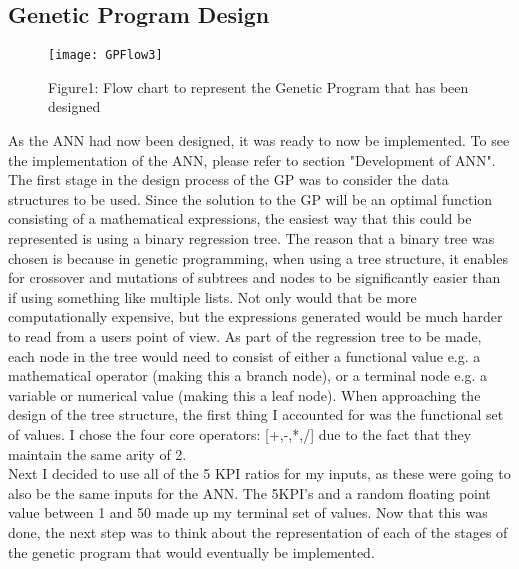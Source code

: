 \documentclass[11pt]{article}
\begin{document}
\subsection{Genetic Program Design}
\begin{figure}[h]
\centering
\texttt{[image: GPFlow3]}
\caption{Figure1: Flow chart to represent the Genetic Program that has been designed} 
\end{figure}
As the ANN had now been designed, it was ready to now be implemented. To see the implementation of the ANN, please refer to section "Development of ANN". The first stage in the design process of the GP was to consider the data structures to be used. Since the solution to the GP will be an optimal function consisting of a mathematical expressions, the easiest way that this could be represented is using a binary regression tree. The reason that a binary tree was chosen is because in genetic programming, when using a tree structure, it enables for crossover and mutations of subtrees and nodes to be significantly easier than if using something like multiple lists. Not only would that be more computationally expensive, but the expressions generated would be much harder to read from a users point of view. As part of the regression tree to be made, each node in the tree would need to consist of either a functional value e.g. a mathematical operator (making this a branch node), or a terminal node e.g. a variable or numerical value (making this a leaf node). When approaching the design of the tree structure, the first thing I accounted for was the functional set of values. I chose the four core operators: [+,-,*,/] due to the fact that they maintain the same arity of 2.\\
 Next I decided to use all of the 5 KPI ratios for my inputs, as these were going to also be the same inputs for the ANN. The 5KPI's and a random floating point value between 1 and 50 made up my terminal set of values. Now that this was done, the next step was to think about the representation of each of the stages of the genetic program that would eventually be implemented. 
\end{document}
